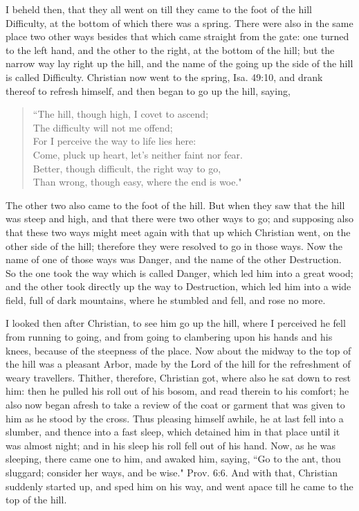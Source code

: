 I beheld then, that they all went on till they came to the foot of the hill Difficulty, at the bottom of which there was a spring. There were also in the same place two other ways besides that which came straight from the gate: one turned to the left hand, and the other to the right, at the bottom of the hill; but the narrow way lay right up the hill, and the name of the going up the side of the hill is called Difficulty. Christian now went to the spring, Isa. 49:10, and drank thereof to refresh himself, and then began to go up the hill, saying,
\begin{verse}
``The hill, though high, I covet to ascend;\\
The difficulty will not me offend;\\
For I perceive the way to life lies here:\\
Come, pluck up heart, let's neither faint nor fear.\\
Better, though difficult, the right way to go,\\
Than wrong, though easy, where the end is woe."\\
\end{verse}

The other two also came to the foot of the hill. But when they saw that the hill was steep and high, and that there were two other ways to go; and supposing also that these two ways might meet again with that up which Christian went, on the other side of the hill; therefore they were resolved to go in those ways. Now the name of one of those ways was Danger, and the name of the other Destruction. So the one took the way which is called Danger, which led him into a great wood; and the other took directly up the way to Destruction, which led him into a wide field, full of dark mountains, where he stumbled and fell, and rose no more.

I looked then after Christian, to see him go up the hill, where I perceived he fell from running to going, and from going to clambering upon his hands and his knees, because of the steepness of the place. Now about the midway to the top of the hill was a pleasant Arbor, made by the Lord of the hill for the refreshment of weary travellers. Thither, therefore, Christian got, where also he sat down to rest him: then he pulled his roll out of his bosom, and read therein to his comfort; he also now began afresh to take a review of the coat or garment that was given to him as he stood by the cross. Thus pleasing himself awhile, he at last fell into a slumber, and thence into a fast sleep, which detained him in that place until it was almost night; and in his sleep his roll fell out of his hand. Now, as he was sleeping, there came one to him, and awaked him, saying, ``Go to the ant, thou sluggard; consider her ways, and be wise." Prov. 6:6. And with that, Christian suddenly started up, and sped him on his way, and went apace till he came to the top of the hill.


